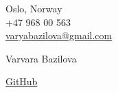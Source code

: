 \documentclass[a4,10pt]{article}
\newcommand{\hskills}[1]{
\textbf{\bfseries #1} }
\begin{document}
\begin{center}
    \begin{minipage}[b]{0.24\textwidth}
            \large Oslo, Norway \\
            \large +47 968 00 563 \\
            \large \href{mailto:varyabazilova@gmail.com}{varyabazilova@gmail.com} 
    \end{minipage}%
    \begin{minipage}[b]{0.5\textwidth}
            \centering
            {\HUGE Varvara Bazilova} \\ %
            \vspace{0.1cm}
    \end{minipage}%
    \begin{minipage}[b]{0.24\textwidth}
            \flushright \large  %
            \href{https://github.com/varyabazilova}{GitHub}
    \end{minipage}
  
    
\end{center}
\end{document}
